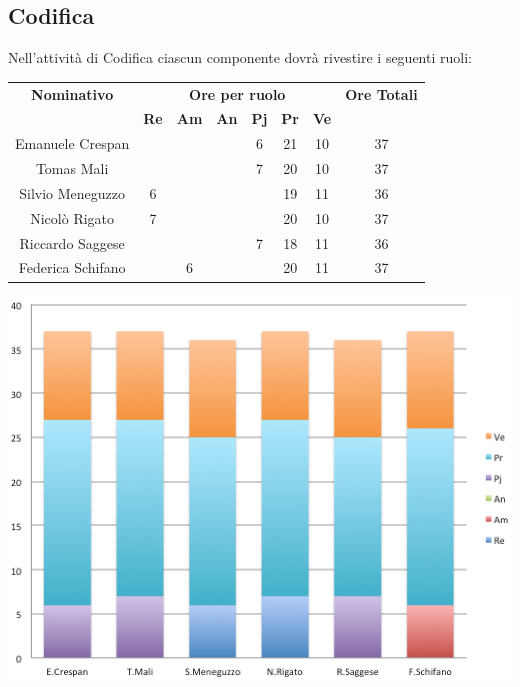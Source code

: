 \subsection{Codifica}
Nell’attività di Codifica ciascun componente dovrà rivestire i seguenti ruoli:
\begin{center}
  \centering
  \begin{tabular} {|c|c|c|c|c|c|c|c|}
    \hline
    \textbf{Nominativo} & \multicolumn{6}{|c|}{\textbf{Ore per ruolo}} & \textbf{Ore Totali} \\
    & \textbf{Re} & \textbf{Am} & \textbf{An} & \textbf{Pj} & \textbf{Pr} & \textbf{Ve} & \\
    \hline
    Emanuele Crespan & & & &6 &21 &10 &37\\
    \hline
    Tomas Mali & & & &7 &20 &10 &37\\
    \hline
    Silvio Meneguzzo &6 & & & &19 &11 &36\\
    \hline
    Nicolò Rigato &7 & & & &20 &10 &37\\
    \hline
    Riccardo Saggese & & & &7 &18 &11 &36\\
    \hline
    Federica Schifano & &6 & & &20 &11 &37\\
    \hline
  \end{tabular}
  \includegraphics[scale=0.65]{img/fig5.png}
\end{center}

